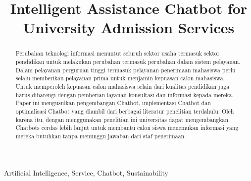 \documentclass[conference]{IEEEtran}
\begin{document}
\title{Intelligent Assistance Chatbot for University Admission Services\\
{\footnotesize \textsuperscript{}}
}

\author{

\and
{}

}
\maketitle
\begin{abstract}
Perubahan teknologi informasi menuntut seluruh sektor usaha termasuk sektor pendidikan untuk melakukan perubahan termasuk perubahan dalam sistem pelayanan. Dalam pelayanan perguruan tinggi termasuk pelayanan penerimaan mahasiswa perlu selalu memberikan pelayanan prima untuk menjamin kepuasan calon mahasiswa. Untuk memperoleh kepuasan calon mahasiswa selain dari kualitas pendidikan juga harus dibarengi dengan pemberian layanan konsultasi dan informasi kepada mereka. Paper ini mengusulkan pengembangan Chatbot, implementasi Chatbot dan optimalisasi Chatbot  yang diambil dari berbagai literatur penelitian terdahulu. Oleh karena itu, dengan menggunakan penelitian ini universitas dapat mengembangkan Chatbots cerdas lebih lanjut untuk membantu calon siswa menemukan informasi yang mereka butuhkan tanpa menunggu jawaban dari staf penerimaan.
\end{abstract}
\begin{IEEEkeywords}
Artificial Intelligence, Service, Chatbot, Sustainability
\end{IEEEkeywords}
\end{document}
